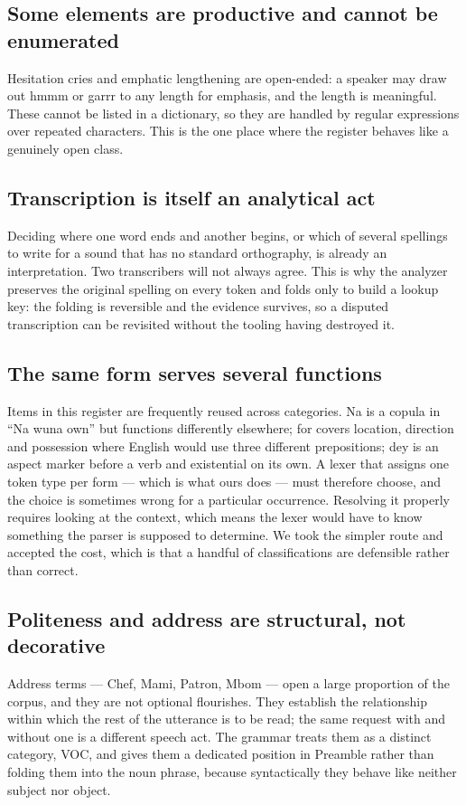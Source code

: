 \documentclass[11pt,a4paper]{article}
\begin{document}
\subsection{Some elements are productive and cannot be enumerated}
Hesitation cries and emphatic lengthening are open-ended: a speaker may draw out hmmm or garrr to any length for emphasis, and the length is meaningful. These cannot be listed in a dictionary, so they are handled by regular expressions over repeated characters. This is the one place where the register behaves like a genuinely open class.

\subsection{Transcription is itself an analytical act}
Deciding where one word ends and another begins, or which of several spellings to write for a sound that has no standard orthography, is already an interpretation. Two transcribers will not always agree. This is why the analyzer preserves the original spelling on every token and folds only to build a lookup key: the folding is reversible and the evidence survives, so a disputed transcription can be revisited without the tooling having destroyed it.

\subsection{The same form serves several functions}
Items in this register are frequently reused across categories. Na is a copula in ``Na wuna own'' but functions differently elsewhere; for covers location, direction and possession where English would use three different prepositions; dey is an aspect marker before a verb and existential on its own. A lexer that assigns one token type per form --- which is what ours does --- must therefore choose, and the choice is sometimes wrong for a particular occurrence. Resolving it properly requires looking at the context, which means the lexer would have to know something the parser is supposed to determine. We took the simpler route and accepted the cost, which is that a handful of classifications are defensible rather than correct.

\subsection{Politeness and address are structural, not decorative}
Address terms --- Chef, Mami, Patron, Mbom --- open a large proportion of the corpus, and they are not optional flourishes. They establish the relationship within which the rest of the utterance is to be read; the same request with and without one is a different speech act. The grammar treats them as a distinct category, VOC, and gives them a dedicated position in Preamble rather than folding them into the noun phrase, because syntactically they behave like neither subject nor object.
\end{document}
